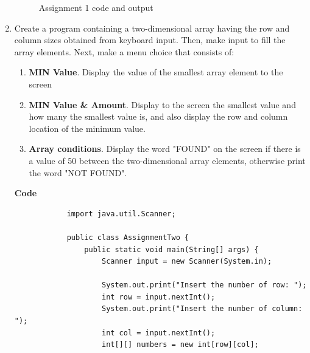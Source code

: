 \documentclass[12pt,titlepage]{article}
\begin{document}
\begin{enumerate}
{        \begin{figure}[h]
            \centering
            \caption{Assignment 1 code and output}
        \end{figure}
    }
    \pagebreak
    \item {
        Create a program containing a two-dimensional array having the row and column sizes obtained from keyboard input.
        Then, make input to fill the array elements. Next, make a menu choice that consists of:
        \begin{enumerate}[label=\alph*.]
            \item \textbf{MIN Value}. Display the value of the smallest array element to the screen
            \item \textbf{MIN Value \& Amount}. Display to the screen the smallest value and how many the smallest value is, and also display the row and column location of the minimum value.
            \item \textbf{Array conditions}. Display the word "FOUND" on the screen if there is a value of 50 between the two-dimensional array elements, otherwise print the word "NOT FOUND".
        \end{enumerate}

        \large{\textbf{Code}}
        \begin{verbatim}
            import java.util.Scanner;

            public class AssignmentTwo {
                public static void main(String[] args) {
                    Scanner input = new Scanner(System.in);

                    System.out.print("Insert the number of row: ");
                    int row = input.nextInt();
                    System.out.print("Insert the number of column: ");
                    int col = input.nextInt();
                    int[][] numbers = new int[row][col];


\end{verbatim}}
\end{enumerate}
\end{document}
